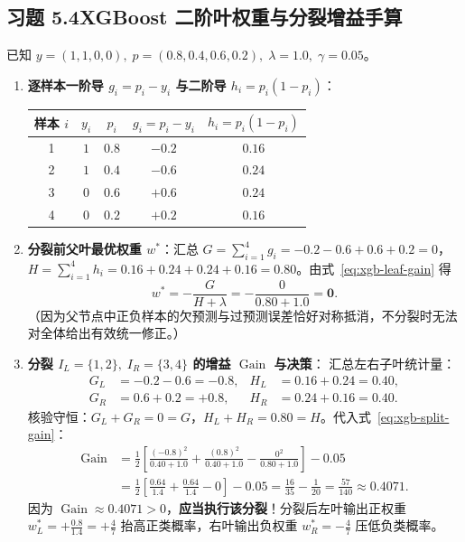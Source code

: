 \subsection*{习题 5.4\quad XGBoost 二阶叶权重与分裂增益手算}
已知 $y = (1, 1, 0, 0),\; p = (0.8, 0.4, 0.6, 0.2),\; \lambda = 1.0,\; \gamma = 0.05$。
\begin{enumerate}[label=(\arabic*), leftmargin=1.8em]
  \item \textbf{逐样本一阶导 $g_i = p_i - y_i$ 与二阶导 $h_i = p_i(1 - p_i)$}：
  \begin{center}\small
  \begin{tabular}{@{}ccccc@{}}
    \toprule
    样本 $i$ & $y_i$ & $p_i$ & $g_i = p_i - y_i$ & $h_i = p_i(1 - p_i)$ \\
    \midrule
    1 & $1$ & $0.8$ & $-0.2$ & $0.16$ \\
    2 & $1$ & $0.4$ & $-0.6$ & $0.24$ \\
    3 & $0$ & $0.6$ & $+0.6$ & $0.24$ \\
    4 & $0$ & $0.2$ & $+0.2$ & $0.16$ \\
    \bottomrule
  \end{tabular}
  \end{center}
  \item \textbf{分裂前父叶最优权重 $w^*$}：汇总 $G = \sum_{i=1}^4 g_i = -0.2 - 0.6 + 0.6 + 0.2 = 0$，$H = \sum_{i=1}^4 h_i = 0.16 + 0.24 + 0.24 + 0.16 = 0.80$。由式~\eqref{eq:xgb-leaf-gain} 得
  \[
    w^* = -\frac{G}{H + \lambda} = -\frac{0}{0.80 + 1.0} = \mathbf{0}.
  \]
  （因为父节点中正负样本的欠预测与过预测误差恰好对称抵消，不分裂时无法对全体给出有效统一修正。）

  \item \textbf{分裂 $I_L = \{1, 2\},\; I_R = \{3, 4\}$ 的增益 $\operatorname{Gain}$ 与决策}：
  汇总左右子叶统计量：
  \begin{align*}
    G_L &= -0.2 - 0.6 = -0.8, & H_L &= 0.16 + 0.24 = 0.40, \\
    G_R &= 0.6 + 0.2 = +0.8, & H_R &= 0.24 + 0.16 = 0.40.
  \end{align*}
  核验守恒：$G_L + G_R = 0 = G$，$H_L + H_R = 0.80 = H$。代入式~\eqref{eq:xgb-split-gain}：
  \begin{align*}
    \operatorname{Gain}
    &= \frac{1}{2}\left[\frac{(-0.8)^2}{0.40 + 1.0} + \frac{(0.8)^2}{0.40 + 1.0} - \frac{0^2}{0.80 + 1.0}\right] - 0.05 \\
    &= \frac{1}{2}\left[\frac{0.64}{1.4} + \frac{0.64}{1.4} - 0\right] - 0.05
    = \frac{16}{35} - \frac{1}{20} = \frac{57}{140} \approx \mathbf{0.4071}.
  \end{align*}
  因为 $\operatorname{Gain} \approx 0.4071 > 0$，\textbf{应当执行该分裂}！分裂后左叶输出正权重 $w_L^* = +\frac{0.8}{1.4} = +\frac{4}{7}$ 抬高正类概率，右叶输出负权重 $w_R^* = -\frac{4}{7}$ 压低负类概率。
\end{enumerate}

